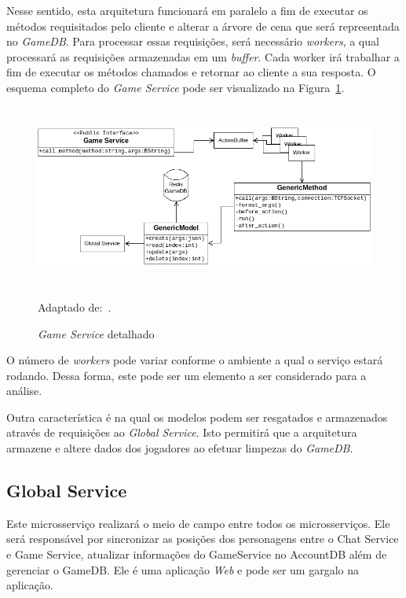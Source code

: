 Nesse sentido, esta arquitetura funcionará em paralelo a fim de executar os métodos requisitados pelo cliente e alterar a árvore de cena que será representada no \textit{GameDB}.
%
Para processar essas requisições, será necessário \textit{workers}, a qual processará as requisições armazenadas em um \textit{buffer}.
%
Cada worker irá trabalhar a fim de executar os métodos chamados e retornar ao cliente a sua resposta.
%
O esquema completo do \textit{Game Service} pode ser visualizado na Figura~\ref{fig:game_service_internal}.



\begin{figure}[htb!]
  \caption{\textit{Game Service} detalhado}
  \label{fig:game_service_internal}
  \includegraphics[height=6cm]{img/cap3/game_service_internal.png}
  \centering

  Adaptado de:~\cite{albion_online_unite}.
\end{figure}



O número de \textit{workers} pode variar conforme o ambiente a qual o serviço estará rodando.
%
Dessa forma, este pode ser um elemento a ser considerado para a análise.



Outra característica é na qual os modelos podem ser resgatados e armazenados através de requisições ao \textit{Global Service}.
%
Isto permitirá que a arquitetura armazene e altere dados dos jogadores ao efetuar limpezas do \textit{GameDB}.



\subsection{Global Service}

Este microsserviço realizará o meio de campo entre todos os microsserviços.
%
Ele será responsável por sincronizar as posições dos personagens entre o Chat Service e Game Service, atualizar informações do GameService no AccountDB além de gerenciar o GameDB.
%
Ele é uma aplicação \textit{Web} e pode ser um gargalo na aplicação.

